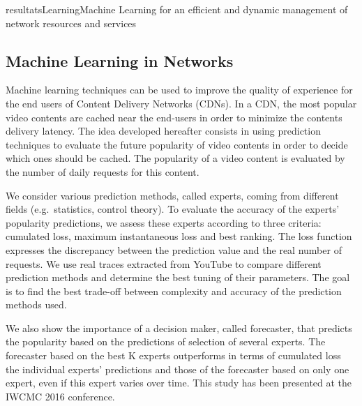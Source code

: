 \documentclass{ra2016}
\begin{document}
\begin{module}{resultats}{Learning}{Machine Learning for an efficient and dynamic management of network resources and services}

\subsection{Machine Learning in Networks}

\begin{participants}
\end{participants}

Machine learning techniques can be used to improve the quality of experience for the end users of Content Delivery Networks (CDNs).
In a CDN, the most popular video contents are cached near the end-users in order to minimize the contents delivery latency.
The idea developed hereafter consists in using prediction techniques to evaluate the future popularity of video contents in order to decide which ones should be cached.
The popularity of a video content is evaluated by the number of daily requests for this content.

We consider various prediction methods, called experts, coming from different fields (e.g.~statistics, control theory).
To evaluate the accuracy of the experts' popularity predictions, we assess these experts according to three criteria: cumulated loss, maximum instantaneous loss and best ranking.
The loss function expresses the discrepancy between the prediction value and the real number of requests.
We use real traces extracted from YouTube to compare different prediction methods and determine the best tuning of their parameters.
The goal is to find the best trade-off between complexity and accuracy of the prediction methods used.

We also show the importance of a decision maker, called forecaster, that predicts the popularity based on the predictions of selection of several experts.
The forecaster based on the best K experts outperforms in terms of cumulated loss the individual experts' predictions and those of the forecaster based on only one expert, even if this expert varies over time.
This study has been presented at the IWCMC 2016 conference.


\end{module}
\end{document}

